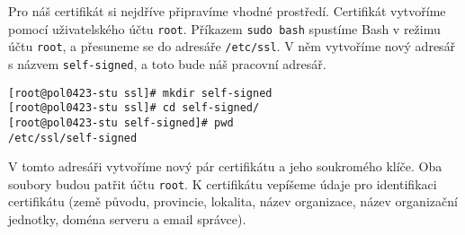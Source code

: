 Pro náš certifikát si nejdříve připravíme vhodné prostředí.
Certifikát vytvoříme pomocí uživatelského účtu \texttt{root}.
Příkazem \texttt{sudo bash} spustíme Bash v režimu účtu
\texttt{root}, a přesuneme se do adresáře \texttt{/etc/ssl}.
V něm vytvoříme nový adresář s názvem \texttt{self-signed},
a toto bude náš pracovní adresář.

\begin{verbatim}
[root@pol0423-stu ssl]# mkdir self-signed
[root@pol0423-stu ssl]# cd self-signed/
[root@pol0423-stu self-signed]# pwd
/etc/ssl/self-signed
\end{verbatim}

V tomto adresáři vytvoříme nový pár certifikátu a jeho
soukromého klíče. Oba soubory budou patřit účtu \texttt{root}.
K certifikátu vepíšeme údaje pro identifikaci certifikátu
(země původu, provincie, lokalita, název organizace, název
organizační jednotky, doména serveru a email správce).

